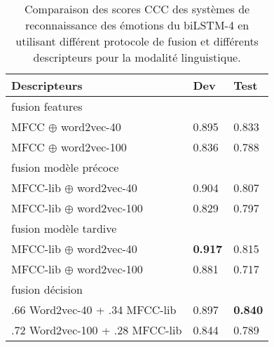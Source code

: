 \begin{table}[h]
  \centering
  \begin{tabular}{|l|l|l|}
  \hline
  Descripteurs   &Dev   &Test  \\
  \hline
  \multicolumn{3}{|l|}{fusion features} \\
  \hline
  MFCC $\oplus$ word2vec-40        &0.895  & 0.833 \\
  MFCC $\oplus$ word2vec-100        &0.836  & 0.788 \\
  \hline
  \multicolumn{3}{|l|}{fusion modèle précoce} \\
  \hline
  MFCC-lib $\oplus$ word2vec-40       & 0.904 & 0.807 \\
  MFCC-lib $\oplus$ word2vec-100       & 0.829 & 0.797 \\
  \hline
  \multicolumn{3}{|l|}{fusion modèle tardive}   \\
  \hline
  MFCC-lib $\oplus$ word2vec-40    & \textbf{0.917}  & 0.815  \\
  MFCC-lib $\oplus$ word2vec-100    & 0.881  & 0.717  \\
  \hline
  \multicolumn{3}{|l|}{fusion décision} \\
  \hline
  .66 Word2vec-40 + .34 MFCC-lib     &0.897  &\textbf{0.840}  \\
  .72 Word2vec-100 + .28 MFCC-lib    &0.844 & 0.789 \\
  \hline
\end{tabular}
\caption{Comparaison des scores CCC des systèmes de reconnaissance des émotions du biLSTM-4 en utilisant différent protocole de fusion et différents descripteurs pour la modalité linguistique.}
\label{tab:res_fusion}
\end{table}
